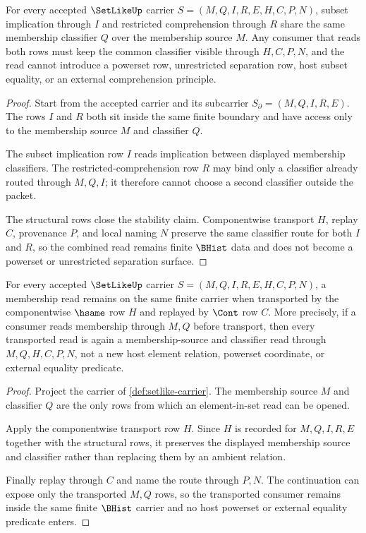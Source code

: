 \begin{theorem}
\label{thm:setlike-subset-comprehension-stability}
For every accepted $\SetLikeUp$ carrier $S=(M,Q,I,R,E,H,C,P,N)$, subset implication through $I$ and restricted comprehension through $R$ share the same membership classifier $Q$ over the membership source $M$. Any consumer that reads both rows must keep the common classifier visible through $H,C,P,N$, and the read cannot introduce a powerset row, unrestricted separation row, host subset equality, or an external comprehension principle.
\end{theorem}
\begin{proof}
Start from the accepted carrier and its subcarrier $S_{\partial}=(M,Q,I,R,E)$. The rows $I$ and $R$ both sit inside the same finite boundary and have access only to the membership source $M$ and classifier $Q$.

The subset implication row $I$ reads implication between displayed membership classifiers. The restricted-comprehension row $R$ may bind only a classifier already routed through $M,Q,I$; it therefore cannot choose a second classifier outside the packet.

The structural rows close the stability claim. Componentwise transport $H$, replay $C$, provenance $P$, and local naming $N$ preserve the same classifier route for both $I$ and $R$, so the combined read remains finite $\BHist$ data and does not become a powerset or unrestricted separation surface.
\end{proof}

\begin{theorem}
\label{thm:setlike-membership-carrier-stability}
For every accepted $\SetLikeUp$ carrier $S=(M,Q,I,R,E,H,C,P,N)$, a membership read remains on the same finite carrier when transported by the componentwise $\hsame$ row $H$ and replayed by $\Cont$ row $C$. More precisely, if a consumer reads membership through $M,Q$ before transport, then every transported read is again a membership-source and classifier read through $M,Q,H,C,P,N$, not a new host element relation, powerset coordinate, or external equality predicate.
\end{theorem}
\begin{proof}
Project the carrier of \autoref{def:setlike-carrier}. The membership source $M$ and classifier $Q$ are the only rows from which an element-in-set read can be opened.

Apply the componentwise transport row $H$. Since $H$ is recorded for $M,Q,I,R,E$ together with the structural rows, it preserves the displayed membership source and classifier rather than replacing them by an ambient relation.

Finally replay through $C$ and name the route through $P,N$. The continuation can expose only the transported $M,Q$ rows, so the transported consumer remains inside the same finite $\BHist$ carrier and no host powerset or external equality predicate enters.
\end{proof}

